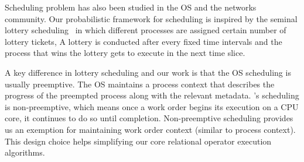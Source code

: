 
Scheduling problem has also been studied in the OS and the networks community. 
Our probabilistic framework for scheduling is inspired by the seminal lottery scheduling~\cite{lottery-scheduling} %
in which different processes are assigned certain number of lottery tickets,
A lottery is conducted after every fixed time intervals and the process that wins the lottery gets to execute in the next time slice. 

A key difference in lottery scheduling and our work is that the OS scheduling is usually preemptive. %
The OS maintains a process context that describes the progress of the preempted process along with the relevant metadata. 
\sys{}'s scheduling is non-preemptive, which means once a work order begins its execution on a CPU core, it continues to do so until completion.
Non-preemptive scheduling provides us an exemption for maintaining work order context (similar to process context).
This design choice helps simplifying our core relational operator execution algorithms.

